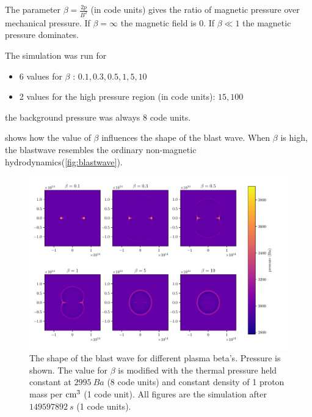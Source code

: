 \documentclass[a4paper]{article}
\numberwithin{figure}{section}
\numberwithin{equation}{section}
\begin{document}
The parameter $\beta = \frac{2p}{B^2}$ (in code units) gives the ratio of magnetic pressure over mechanical pressure. 
If $\beta = \infty$ the magnetic field is $0$. 
If $\beta \ll 1$ the magnetic pressure dominates. 

The simulation was run for 
\begin{itemize}
	\item 6 values for $\beta$ : $0.1, 0.3, 0.5, 1, 5, 10$
	\item 2 values for the high pressure region (in code units): $15, 100$ 
\end{itemize}
the background pressure was always $8$ code units.

 shows how the value of $\beta$ influences the shape of the blast wave. When $\beta$ is high, the blastwave resembles the ordinary non-magnetic hydrodynamics(\cref{fig:blastwave}).
\begin{figure}[H]
	\centering
	\includegraphics[width = \linewidth]{figures/influence_beta.pdf}
	\caption{The shape of the blast wave for different plasma beta's. Pressure is shown. The value for $\beta$ is modified with the thermal pressure held constant at $\SI{2995}{Ba}$ (8 code units) and constant density of 1 proton mass per  $\si{cm\cubed}$ (1 code unit). All figures are the simulation after $\SI{149597892}{s}$ (1 code units).}
\label{fig:blastwave_shape_beta}
\end{figure}
\end{document}

